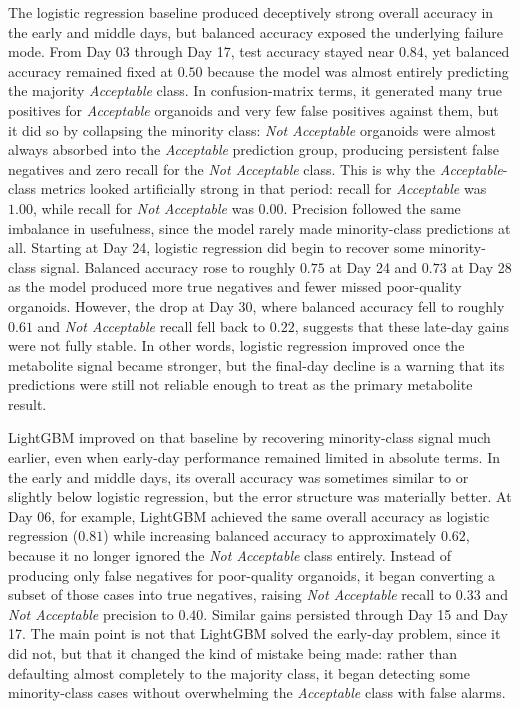 \documentclass{article}
\begin{document}
The logistic regression baseline produced deceptively strong overall accuracy in the early and middle days, but balanced accuracy exposed the underlying failure mode. From Day 03 through Day 17, test accuracy stayed near $0.84$, yet balanced accuracy remained fixed at $0.50$ because the model was almost entirely predicting the majority \textit{Acceptable} class. In confusion-matrix terms, it generated many true positives for \textit{Acceptable} organoids and very few false positives against them, but it did so by collapsing the minority class: \textit{Not Acceptable} organoids were almost always absorbed into the \textit{Acceptable} prediction group, producing persistent false negatives and zero recall for the \textit{Not Acceptable} class. This is why the \textit{Acceptable}-class metrics looked artificially strong in that period: recall for \textit{Acceptable} was $1.00$, while recall for \textit{Not Acceptable} was $0.00$. Precision followed the same imbalance in usefulness, since the model rarely made minority-class predictions at all. Starting at Day 24, logistic regression did begin to recover some minority-class signal. Balanced accuracy rose to roughly $0.75$ at Day 24 and $0.73$ at Day 28 as the model produced more true negatives and fewer missed poor-quality organoids. However, the drop at Day 30, where balanced accuracy fell to roughly $0.61$ and \textit{Not Acceptable} recall fell back to $0.22$, suggests that these late-day gains were not fully stable. In other words, logistic regression improved once the metabolite signal became stronger, but the final-day decline is a warning that its predictions were still not reliable enough to treat as the primary metabolite result.

LightGBM improved on that baseline by recovering minority-class signal much earlier, even when early-day performance remained limited in absolute terms. In the early and middle days, its overall accuracy was sometimes similar to or slightly below logistic regression, but the error structure was materially better. At Day 06, for example, LightGBM achieved the same overall accuracy as logistic regression ($0.81$) while increasing balanced accuracy to approximately $0.62$, because it no longer ignored the \textit{Not Acceptable} class entirely. Instead of producing only false negatives for poor-quality organoids, it began converting a subset of those cases into true negatives, raising \textit{Not Acceptable} recall to $0.33$ and \textit{Not Acceptable} precision to $0.40$. Similar gains persisted through Day 15 and Day 17. The main point is not that LightGBM solved the early-day problem, since it did not, but that it changed the kind of mistake being made: rather than defaulting almost completely to the majority class, it began detecting some minority-class cases without overwhelming the \textit{Acceptable} class with false alarms.
\end{document}
